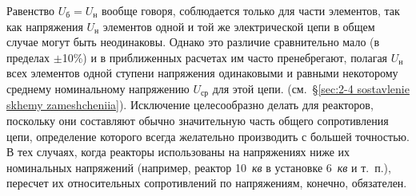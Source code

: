 Равенство $ U_{\text{б}} = U_{\text{н}} $ вообще говоря, соблюдается только для части элементов, так как напряжения $ U_{\text{н}} $ элементов одной и той же электрической цепи в общем случае могут быть неодинаковы. Однако это различие сравнительно мало (в пределах $ \pm $10\%) и в приближенных расчетах им часто пренебрегают, полагая $ U_{\text{н}} $ всех элементов одной ступени напряжения одинаковыми и равными некоторому среднему номинальному напряжению $ U_{\text{ср}} $ для этой цепи. (см.~§\ref{sec:2-4 sostavlenie skhemy zameshcheniia}). Исключение целесообразно делать для реакторов, поскольку они составляют обычно значительную часть общего сопротивления цепи, определение которого всегда желательно производить с большей точностью. В тех случаях, когда реакторы использованы на напряжениях ниже их номинальных напряжений (например, реактор 10~\textit{кв} в установке 6~\textit{кв} и т.~п.), пересчет их относительных сопротивлений по напряжениям, конечно, обязателен.

\setcounter{example}{1}

